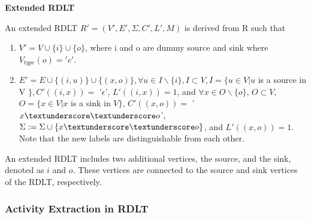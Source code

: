 \documentclass[12pt]{article}
\begin{document}
        \begin{definition} \textbf{Extended RDLT} \cite{malinao-rdlt}

            An extended RDLT \begin{math}R' = (V',E',\Sigma,C',L',M)\end{math} is derived from R such that

            \begin{enumerate}
                
                \item $V' = V \cup \{i\} \cup \{o\}$, where i and o are dummy source and sink where \begin{math}V_{type}(o) = 'c'\end{math}.

                \item $E' = E \cup \{(i,u)\} \cup \{(x,o)\}, \forall u \in I\backslash \{i\}, I \subset V, I = \{u \in V | u$ is a source in V $\}, C'((i,x)) = $ '$\epsilon$', $L'((i,x)) = 1$, and $\forall x \in O\backslash \{o\}$, $O \subset V$, $O = \{x \in V | x$ is a sink in $V\}$, $C'((x,o)) = $ '$x\textunderscore \textunderscore o$', $\Sigma := \Sigma \cup \{x\textunderscore\textunderscore o\}$, and $L'((x,o)) = 1$. Note that the new labels are distinguishable from each other.
                
            \end{enumerate}
            
        \end{definition}

        An extended RDLT includes two additional vertices, the source, and the sink, denoted as $i$ and $o$. These vertices are connected to the source and sink vertices of the RDLT, respectively.

        \subsubsection*{Activity Extraction in RDLT}
        
\end{document}
